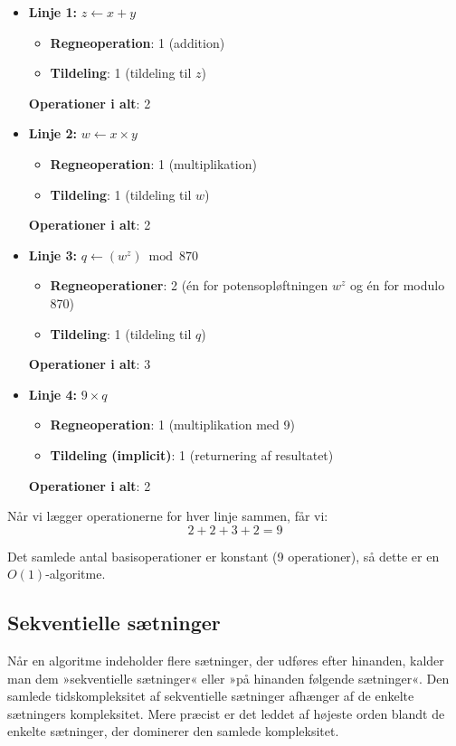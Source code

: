 \begin{itemize}
    \item \textbf{Linje 1:} $z \gets x + y$
    \begin{itemize}
        \item \textbf{Regneoperation}: 1 (addition)
        \item \textbf{Tildeling}: 1 (tildeling til $z$)
    \end{itemize}
    \textbf{Operationer i alt}: 2
    
    \item \textbf{Linje 2:} $w \gets x \times y$
    \begin{itemize}
        \item \textbf{Regneoperation}: 1 (multiplikation)
        \item \textbf{Tildeling}: 1 (tildeling til $w$)
    \end{itemize}
    \textbf{Operationer i alt}: 2
    
    \item \textbf{Linje 3:} $q \gets (w^z) \bmod 870$
    \begin{itemize}
        \item \textbf{Regneoperationer}: 2 (én for potensopløftningen $w^z$ og én for modulo 870)
        \item \textbf{Tildeling}: 1 (tildeling til $q$)
    \end{itemize}
    \textbf{Operationer i alt}: 3
    
    \item \textbf{Linje 4:} \Return $9 \times q$
    \begin{itemize}
        \item \textbf{Regneoperation}: 1 (multiplikation med 9)
        \item \textbf{Tildeling (implicit)}: 1 (returnering af resultatet)
    \end{itemize}
    \textbf{Operationer i alt}: 2
\end{itemize}

Når vi lægger operationerne for hver linje sammen, får vi:
\[
2 + 2 + 3 + 2 = 9
\]

Det samlede antal basisoperationer er konstant (9 operationer), så dette er en $O(1)$-algoritme.

\subsection*{Sekventielle sætninger}

Når en algoritme indeholder flere sætninger, der udføres efter hinanden, kalder man dem »sekventielle sætninger« eller »på hinanden følgende sætninger«. Den samlede tidskompleksitet af sekventielle sætninger afhænger af de enkelte sætningers kompleksitet. Mere præcist er det leddet af højeste orden blandt de enkelte sætninger, der dominerer den samlede kompleksitet.

